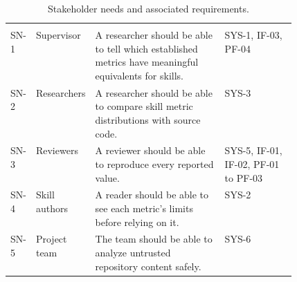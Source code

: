 \begin{singlespace}
\setlength{\LTcapwidth}{\linewidth}
\begin{longtable}{@{}L{0.07\linewidth} L{0.16\linewidth} L{\tabcolsep\relax} L{0.25\linewidth}@{}}
\caption{Stakeholder needs and associated requirements.}\label{tab:needs}\\
 &  &  & \\
\midrule
\endfirsthead
{}
 &  &  & \\
\midrule
\endhead
\bottomrule
\endfoot
SN-1 & Supervisor & A researcher should be able to tell which established metrics have meaningful equivalents for skills. & SYS-1, IF-03, PF-04\\
\addlinespace[3pt]
SN-2 & Researchers & A researcher should be able to compare skill metric distributions with source code. & SYS-3\\
\addlinespace[3pt]
SN-3 & Reviewers & A reviewer should be able to reproduce every reported value. & SYS-5, IF-01, IF-02, PF-01 to PF-03\\
\addlinespace[3pt]
SN-4 & Skill authors & A reader should be able to see each metric's limits before relying on it. & SYS-2\\
\addlinespace[3pt]
SN-5 & Project team & The team should be able to analyze untrusted repository content safely. & SYS-6\\
\end{longtable}
\end{singlespace}

